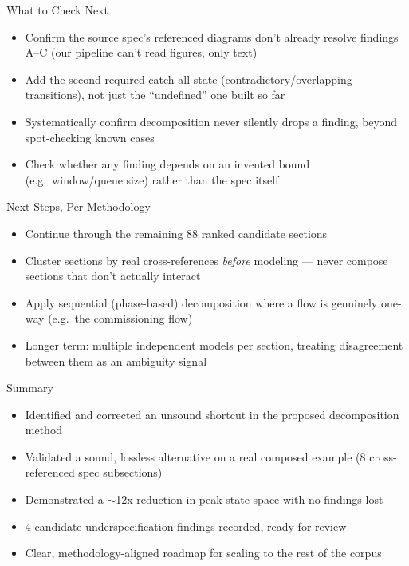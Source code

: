 \documentclass{beamer}
\begin{document}
\begin{frame}{What to Check Next}
\begin{itemize}
  \item Confirm the source spec's referenced diagrams don't already
        resolve findings A--C (our pipeline can't read figures, only text)
  \item Add the second required catch-all state (contradictory/overlapping
        transitions), not just the ``undefined'' one built so far
  \item Systematically confirm decomposition never silently drops a
        finding, beyond spot-checking known cases
  \item Check whether any finding depends on an invented bound
        (e.g.\ window/queue size) rather than the spec itself
\end{itemize}
\end{frame}

\begin{frame}{Next Steps, Per Methodology}
\begin{itemize}
  \item Continue through the remaining 88 ranked candidate sections
  \item Cluster sections by real cross-references \emph{before} modeling —
        never compose sections that don't actually interact
  \item Apply sequential (phase-based) decomposition where a flow is
        genuinely one-way (e.g.\ the commissioning flow)
  \item Longer term: multiple independent models per section, treating
        disagreement between them as an ambiguity signal
\end{itemize}
\end{frame}

\begin{frame}{Summary}
\begin{itemize}
  \item Identified and corrected an unsound shortcut in the proposed
        decomposition method
  \item Validated a sound, lossless alternative on a real composed example
        (8 cross-referenced spec subsections)
  \item Demonstrated a $\sim$12x reduction in peak state space with no
        findings lost
  \item 4 candidate underspecification findings recorded, ready for review
  \item Clear, methodology-aligned roadmap for scaling to the rest of the
        corpus
\end{itemize}
\end{frame}
\end{document}
